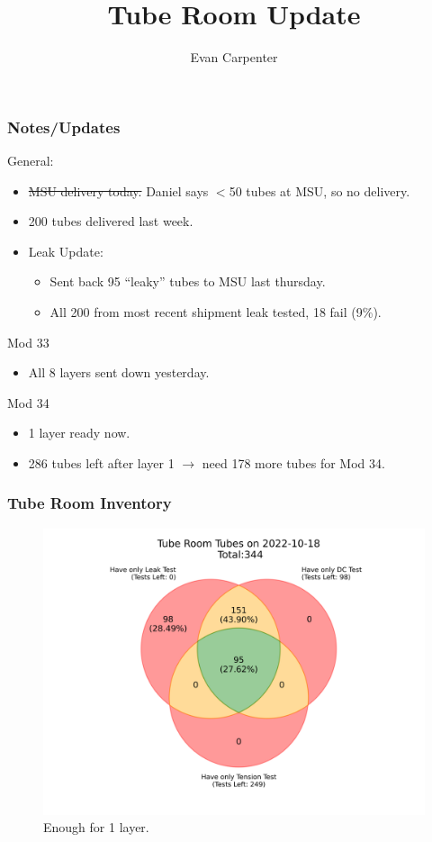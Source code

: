 \documentclass{beamer}
\title{Tube Room Update}
\author{Evan Carpenter}
\begin{document}
\begin{frame}
	\titlepage
\end{frame}

\begin{frame}
	\frametitle{Notes/Updates}
	\begin{block}{General:}
		\begin{itemize}
			\item \sout{MSU delivery today.} Daniel says $<$50 tubes at MSU, so no delivery. 
			\item 200 tubes delivered last week.
			\item Leak Update:
			\begin{itemize}
				\item Sent back 95 ``leaky'' tubes to MSU last thursday. 
				\item All 200 from most recent shipment leak tested, 18 fail (9\%). 
			\end{itemize}
		\end{itemize}
	\end{block}
	\begin{block}{Mod 33}
		\begin{itemize}
			\item All 8 layers sent down yesterday.
		\end{itemize}
	\end{block}
	\begin{block}{Mod 34}
		\begin{itemize}
			\item 1 layer ready now. 
			\item 286 tubes left after layer 1 $\rightarrow$ need 178 more tubes for Mod 34.
		\end{itemize}
	\end{block}
\end{frame}

\begin{frame}
	\frametitle{Tube Room Inventory}
	\begin{figure}
		\centering
		\includegraphics[width=0.7\linewidth]{"tubepopulation.png"}
		\caption{\small Enough for 1 layer.}
	\end{figure}
\end{frame}
\end{document}
